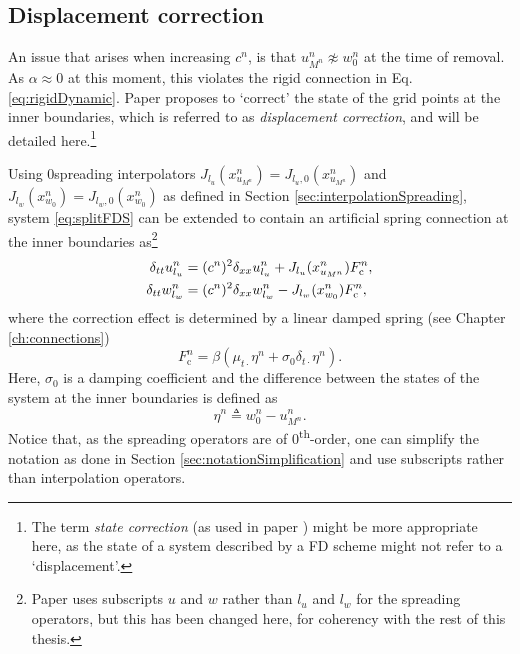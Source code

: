 \subsection{Displacement correction}
An issue that arises when increasing $c^n$, is that $u_{M^n}^n \not\approx w_0^n$ at the time of removal. As $\alpha \approx 0$ at this moment, this violates the rigid connection in Eq. \eqref{eq:rigidDynamic}.
Paper \citeP[G] proposes to `correct' the state of the grid points at the inner boundaries, which is referred to as \textit{displacement correction}, and will be detailed here.\footnote{The term \textit{state correction} (as used in paper \citeP[H]) might be more appropriate here, as the state of a system described by a FD scheme might not refer to a `displacement'.} 

Using 0\thOrder spreading interpolators  $J_{l_u}(x_{u_{M^n}}^n) = J_{l_u, 0}(x_{u_{M^n}}^n)$ and \linebreak$J_{l_w}(x_{w_0}^n) = J_{l_w,0}(x_{w_0}^n)$ as defined in Section \ref{sec:interpolationSpreading}, system \eqref{eq:splitFDS} can be extended to contain an artificial spring connection at the inner boundaries as\footnote{Paper \citeP[G] uses subscripts $u$ and $w$ rather than $l_u$ and $l_w$ for the spreading operators, but this has been changed here, for coherency with the rest of this thesis.}
\begin{subequations}\label{eq:sysDispCorr}
\begin{align}
    \delta_{tt}\ulun &= (c^n)^2\delta_{xx}\ulun+ J_{l_u}(x_{u_{M^n}}^n)%
    F_\text{c}^n,\\
    \delta_{tt}\wlwn &= (c^n)^2\delta_{xx}\wlwn - J_{l_w}(x_{w_0}^n)%
    F_\text{c}^n,
\end{align}
\end{subequations}
where the correction effect %
is determined by a linear damped spring (see Chapter \ref{ch:connections})
\begin{equation}\label{eq:dispCorrForce}
    F_\text{c}^n = \beta \left(\mu_{t\cdot}\eta^n +\sigma_0\delta_{t\cdot}\eta^n \right).
\end{equation}
Here, $\sigma_0$ is a damping coefficient and the difference between the states of the system at the inner boundaries is defined as
\begin{equation}\label{eq:etaDispCorr}
    \eta^n \triangleq w_0^n - u_{M^n}^n.
\end{equation}
Notice that, as the spreading operators are of 0\textsuperscript{th}-order, one can simplify the notation as done in Section \ref{sec:notationSimplification} and use subscripts rather than interpolation operators.

